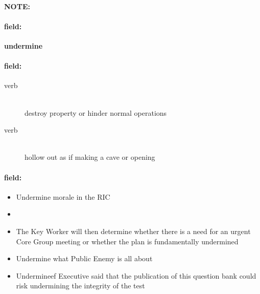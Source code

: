 \documentclass[12pt]{article}
\newenvironment{note}{\paragraph{NOTE:}}{}
\newenvironment{field}{\paragraph{field:}}{}
\begin{document}
\begin{note}
\begin{field}
\textbf{\large undermine}
\end{field}


\begin{field}
\begin{description}
\item[verb] \hfill \\ 
destroy property or hinder normal operations

\item[verb] \hfill \\ 
hollow out as if making a cave or opening

\end{description}
\end{field}

\begin{field}
\begin{itemize}
\item Undermine morale in the RIC
\item 
\item The Key Worker will then determine whether there is a need for an urgent Core Group meeting or whether the plan is fundamentally undermined
\item Undermine what Public Enemy is all about
\item Undermineef Executive said that the publication of this question bank could risk undermining the integrity of the test
\end{itemize}
\end{field}
\end{note}
\end{document}
